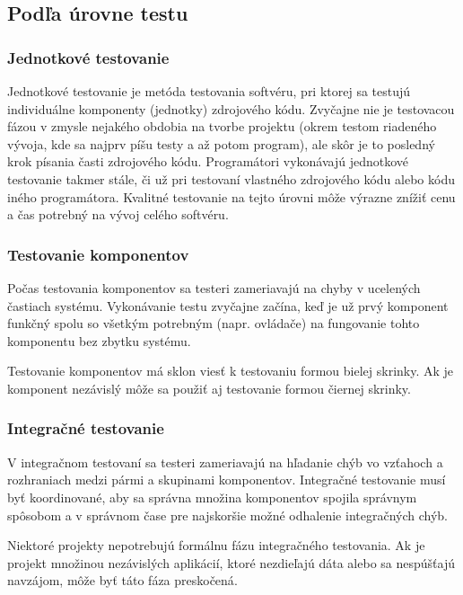 \documentclass[11pt,twoside,slovak,a4paper]{article}
\begin{document}
	\subsection{Podľa úrovne testu}
		\subsubsection{Jednotkové testovanie} 
		
			Jednotkové testovanie je metóda testovania softvéru, pri ktorej sa testujú individuálne komponenty (jednotky) zdrojového kódu. Zvyčajne nie je testovacou fázou v zmysle nejakého obdobia na tvorbe projektu (okrem testom riadeného vývoja, kde sa najprv píšu testy a až potom program), ale skôr je to posledný krok písania časti zdrojového kódu. Programátori vykonávajú jednotkové testovanie takmer stále, či už pri testovaní vlastného zdrojového kódu alebo kódu iného programátora\cite{Alba2008}. Kvalitné testovanie na tejto úrovni môže výrazne znížiť cenu a čas potrebný na vývoj celého softvéru\cite{EST2002}.
		\subsubsection{Testovanie komponentov} 
		
			Počas testovania komponentov sa testeri zameriavajú na chyby v ucelených častiach systému. Vykonávanie testu zvyčajne začína, keď je už prvý komponent funkčný spolu so všetkým potrebným (napr. ovládače) na fungovanie tohto komponentu bez zbytku systému\cite{Alba2008}.
			
			Testovanie komponentov má sklon viesť k testovaniu formou bielej skrinky. Ak je komponent nezávislý môže sa použiť aj testovanie formou čiernej skrinky\cite{Alba2008}.
		\subsubsection{Integračné testovanie} 
		
			V integračnom testovaní sa testeri zameriavajú na hľadanie chýb vo vzťahoch a rozhraniach medzi pármi a skupinami komponentov. Integračné testovanie musí byť koordinované, aby sa správna množina komponentov spojila správnym spôsobom a v správnom čase	pre najskoršie možné odhalenie integračných chýb\cite{Alba2008}.
			
			Niektoré projekty nepotrebujú formálnu fázu integračného testovania. Ak je projekt množinou nezávislých aplikácií, ktoré nezdieľajú dáta alebo sa nespúšťajú navzájom, môže byť táto fáza preskočená\cite{Alba2008}.
\end{document}
